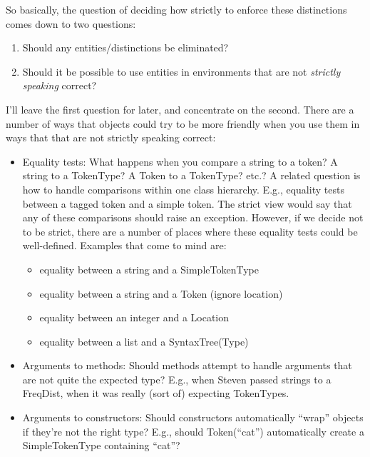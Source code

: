 \documentclass{article}
\begin{document}
So basically, the question of deciding how strictly to enforce these
distinctions comes down to two questions:

\begin{enumerate}
  \item Should any entities/distinctions be eliminated?
  \item Should it be possible to use entities in environments that
        are not \emph{strictly speaking} correct?
\end{enumerate}

I'll leave the first question for later, and concentrate on the
second.  There are a number of ways that objects could try to be more
friendly when you use them in ways that that are not strictly speaking
correct:

\begin{itemize}
  \item Equality tests: What happens when you compare a string to a
  token?  A string to a TokenType?  A Token to a TokenType?  etc.?  A
  related question is how to handle comparisons within one class
  hierarchy.  E.g., equality tests between a tagged token and a simple
  token.  The strict view would say that any of these comparisons
  should raise an exception.  However, if we decide not to be strict,
  there are a number of places where these equality tests could be
  well-defined.  Examples that come to mind are:
  \begin{itemize}
    \item equality between a string and a SimpleTokenType
    \item equality between a string and a Token (ignore location)
    \item equality between an integer and a Location
    \item equality between a list and a SyntaxTree(Type)
  \end{itemize}

  \item Arguments to methods: Should methods attempt to handle
  arguments that are not quite the expected type?  E.g., when Steven
  passed strings to a FreqDist, when it was really (sort of) expecting
  TokenTypes.

  \item Arguments to constructors: Should constructors automatically
  ``wrap'' objects if they're not the right type?  E.g., should
  Token(``cat'') automatically create a SimpleTokenType containing
  ``cat''?
\end{itemize}
\end{document}
